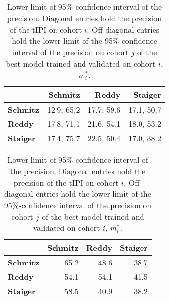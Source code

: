 \begin{table}
    \centering
    \begin{subtable}{\textwidth}
        \centering
        \begin{tabular}{lrrr}
            \hline
            & \textbf{Schmitz} & \textbf{Reddy} & \textbf{Staiger} \\
            \hline
            \textbf{Schmitz} & \num{12.9}, \num{65.2} & \num{17.7}, \num{59.6} & \num{17.1}, \num{50.7} \\
            \textbf{Reddy} & \num{17.8}, \num{71.1} & \num{21.6}, \num{54.1} & \num{18.0}, \num{53.2} \\
            \textbf{Staiger} & \num{17.4}, \num{75.7} & \num{22.5}, \num{50.4} & \num{17.0}, \num{38.2} \\
            \hline
        \end{tabular}
        \caption{Prevalence and precision.
            Diagonal entries $(i, i)$ hold prevalence, precision of the $\text{tIPI}$ on 
            cohort $i$. Off-diagonal entries $(i, j)$ hold prevalence, precision on cohort $j$ of 
            the best model trained and validated on cohort $i$, $m_i^*$.}\label{subtab:inter-prev-prec}
    \end{subtable}

    \vspace{0.5cm}
    \begin{subtable}{\textwidth}
        \centering
        \begin{tabular}{lrrr}
            \hline
            & \textbf{Schmitz} & \textbf{Reddy} & \textbf{Staiger} \\
            \hline
            \textbf{Schmitz} & \num{65.2} & \num{48.6} & \num{38.7} \\
            \textbf{Reddy} & \num{54.1} & \num{54.1} & \num{41.5} \\
            \textbf{Staiger} & \num{58.5} & \num{40.9} & \num{38.2} \\
            \hline
        \end{tabular}
        \caption{Lower limit of \num{95}\%-confidence interval of the precision.
            Diagonal entries hold the precision of the $\text{tIPI}$ on cohort $i$. Off-diagonal 
            entries hold the lower limit of the \num{95}\%-confidence interval of the precision on 
            cohort $j$ of the best model trained and validated on cohort $i$, $m_i^*$.}
            \label{subtab:inter-prec-ci}
    \end{subtable}


\end{table}
